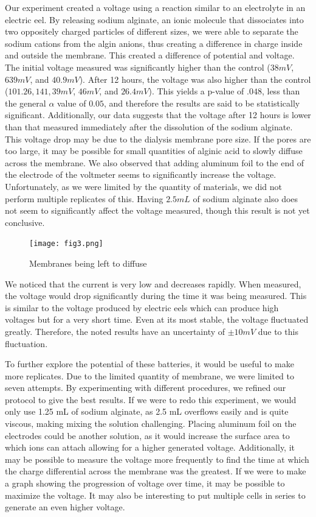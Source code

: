 \documentclass[letterpaper]{article}
\begin{document}
Our experiment created a voltage using a reaction similar to an electrolyte in an electric 
eel. By releasing sodium alginate, an ionic molecule that dissociates into two oppositely 
charged particles of different sizes, we were able to separate the sodium cations from the 
algin anions, thus creating a difference in charge inside and outside the membrane. This 
created a difference of potential and voltage. The initial voltage measured was significantly 
higher than the control ($38mV$, $639mV$, and $40.9mV$). After 12 hours, the voltage was also higher 
than the control ($101.26,141,39mV$, $46mV$, and $26.4 mV$). This yields a p-value of $.048$, less than 
the general $\alpha$ value of $0.05$, and therefore the results are said to be statistically significant. 
Additionally, our data suggests that the voltage after 12 hours is lower than that measured 
immediately after the dissolution of the sodium alginate. This voltage drop may be due to the 
dialysis membrane pore size. If the pores are too large, it may be possible for small quantities of 
alginic acid to slowly diffuse across the membrane. We also observed that adding aluminum foil to 
the end of the electrode of the voltmeter seems to significantly increase the voltage. Unfortunately, 
as we were limited by the quantity of materials, we did not perform multiple replicates of this. 
Having $2.5mL$ of sodium alginate also does not seem to significantly affect the voltage measured, though 
this result is not yet conclusive.

\begin{figure}
	\centering
	\texttt{[image: fig3.png]}
	\caption{Membranes being left to diffuse}
	\label{fig:3}
\end{figure}

We noticed that the current is very low and decreases rapidly. When measured, the voltage would drop 
significantly during the time it was being measured. This is similar to the voltage produced by electric 
eels which can produce high voltages but for a very short time. Even at its most stable, the voltage 
fluctuated greatly. Therefore, the noted results have an uncertainty of $\pm 10mV$ due to this fluctuation.

To further explore the potential of these batteries, it would be useful to make more replicates. Due 
to the limited quantity of membrane, we were limited to seven attempts. By experimenting with different 
procedures, we refined our protocol to give the best results. If we were to redo this experiment, we 
would only use 1.25 mL of sodium alginate, as 2.5 mL overflows easily and is quite viscous, making mixing 
the solution challenging. Placing aluminum foil on the electrodes could be another solution, as it would 
increase the surface area to which ions can attach allowing for a higher generated voltage. Additionally, 
it may be possible to measure the voltage more frequently to find the time at which the charge differential 
across the membrane was the greatest. If we were to make a graph showing the progression of voltage over 
time, it may be possible to maximize the voltage. It may also be interesting to put multiple cells in series 
to generate an even higher voltage.


\printbibliography[heading=bibintoc]
\end{document}
